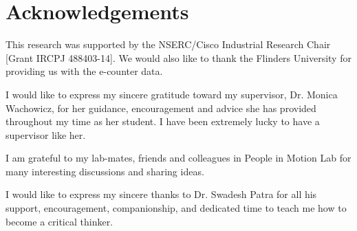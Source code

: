 \chapter*{Acknowledgements}

This research was supported by the NSERC/Cisco Industrial Research Chair [Grant IRCPJ 488403-14]. We would also like to thank the Flinders University for providing us with the e-counter data.

I would like to express my sincere gratitude toward my supervisor, Dr. Monica Wachowicz, for her guidance, encouragement and advice she has provided throughout my time as her student. I have been extremely lucky to have a supervisor like her.


I am grateful to my lab-mates, friends and colleagues in People in Motion Lab for many interesting discussions and sharing ideas. 

I would like to express my sincere thanks to Dr. Swadesh Patra for all his support, encouragement, companionship, and dedicated time to teach me how to become a critical thinker.
